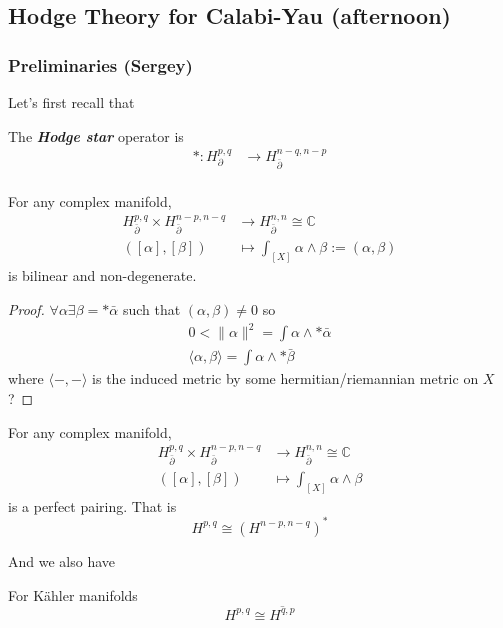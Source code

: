 \subsection{Hodge Theory for Calabi-Yau (afternoon)}
\subsubsection{Preliminaries (Sergey)}
Let's first recall that
\begin{defn}
	The \textbf{\textit{Hodge star}} operator is 
	\begin{align*}
		*:H_\partial^{p,q}&\to H_{\bar\partial}^{n-q,n-p}\\
	\end{align*}
\end{defn}
\begin{prop}
	For any complex manifold,
	\begin{align*}
		H^{p,q}_{\bar\partial}\times H^{n-p,n-q}_{\bar\partial}&\to H^{n,n}_{\bar\partial}\cong\mathbb{C}\\
		([\alpha],[\beta])&\mapsto\int_{[X]}\alpha\wedge\beta:=(\alpha,\beta)
	\end{align*}
	is bilinear and non-degenerate.
\end{prop}
\begin{proof}
	$\forall\alpha\exists\beta=*\bar\alpha$ such that $(\alpha,\beta)\neq0$ so
	\begin{align*}
		0<\|\alpha\|^2=\int\alpha\wedge*\bar\alpha\\
		\langle\alpha,\beta\rangle=\int\alpha\wedge*\bar\beta
	\end{align*}
	{\color{magenta}where $\langle-,-\rangle$ is the induced metric by some hermitian/riemannian metric on $X$?}
\end{proof}

\begin{thm}
	For any complex manifold,
	\begin{align*}
		H^{p,q}_{\bar\partial}\times H^{n-p,n-q}_{\bar\partial}&\to H^{n,n}_{\bar\partial}\cong\mathbb{C}\\
		([\alpha],[\beta])&\mapsto\int_{[X]}\alpha\wedge\beta
	\end{align*}
	is a perfect pairing. That is
	\[H^{p,q}\cong(H^{n-p,n-q})^*\]
\end{thm}
And we also have
\begin{thm}[Hodge]
	For Kähler manifolds
	\[H^{p,q}\cong \overline{H^{q,p}}\]
\end{thm}

